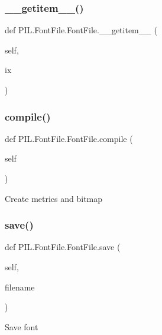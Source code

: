 \subsubsection{\texorpdfstring{\+\_\+\+\_\+getitem\+\_\+\+\_\+()}{\_\_getitem\_\_()}}
{\footnotesize\ttfamily def P\+I\+L.\+Font\+File.\+Font\+File.\+\_\+\+\_\+getitem\+\_\+\+\_\+ (\begin{DoxyParamCaption}\item[{}]{self,  }\item[{}]{ix }\end{DoxyParamCaption})}

\mbox{\label{classPIL_1_1FontFile_1_1FontFile_aec1bd19102ac5a9ef7031cddb0a4fd87}} 
\subsubsection{\texorpdfstring{compile()}{compile()}}
{\footnotesize\ttfamily def P\+I\+L.\+Font\+File.\+Font\+File.\+compile (\begin{DoxyParamCaption}\item[{}]{self }\end{DoxyParamCaption})}

\begin{DoxyVerb}Create metrics and bitmap\end{DoxyVerb}
 \mbox{\label{classPIL_1_1FontFile_1_1FontFile_a9b557113301e4ed5664e7a7913119c90}} 
\subsubsection{\texorpdfstring{save()}{save()}}
{\footnotesize\ttfamily def P\+I\+L.\+Font\+File.\+Font\+File.\+save (\begin{DoxyParamCaption}\item[{}]{self,  }\item[{}]{filename }\end{DoxyParamCaption})}

\begin{DoxyVerb}Save font\end{DoxyVerb}
 

